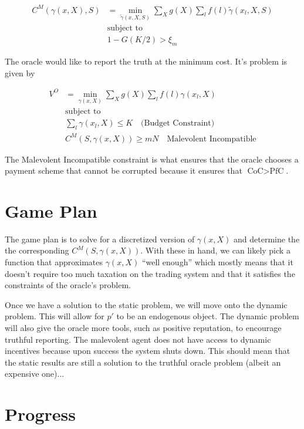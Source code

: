 \documentclass[12pt]{article}
\begin{document}
  \begin{align*}
    C^M(\gamma(x, X), S) &= \min_{\tilde{\gamma}(x, X, S)} \sum_{X} g(X) \sum_{l} f(l) \tilde{\gamma}(x_l, X, S) \\
    &\text{subject to} \\
    &1 - G(K/2) > \xi_m
  \end{align*}

  The oracle would like to report the truth at the minimum cost. It's problem is given by

  \begin{align*}
    V^O &= \min_{\gamma(x, X)} \sum_X g(X) \sum_l f(l) \gamma(x_l, X) \\
    &\text{subject to } \\
    &\sum_l \gamma(x_l, X) \leq K \quad \text{(Budget Constraint)} \\
    &C^M(S, \gamma(x, X)) \geq mN \quad \text{Malevolent Incompatible}
  \end{align*}

  The Malevolent Incompatible constraint is what ensures that the oracle chooses a payment scheme
  that cannot be corrupted because it ensures that $\text{CoC} > \text{PfC}$.


\section{Game Plan}

  The game plan is to solve for a discretized version of $\gamma(x, X)$ and determine the the
  corresponding $C^M(S, \gamma(x, X))$. With these in hand, we can likely pick a function that
  approximates $\gamma(x, X)$ ``well enough'' which mostly means that it doesn't require too
  much taxation on the trading system and that it satisfies the constraints of the oracle's problem.

  Once we have a solution to the static problem, we will move onto the dynamic problem. This will
  allow for $p'$ to be an endogenous object. The dynamic problem will also give the oracle more
  tools, such as positive reputation, to encourage truthful reporting. The malevolent agent does not
  have access to dynamic incentives because upon success the system shuts down. This should mean
  that the static results are still a solution to the truthful oracle problem (albeit an expensive
  one)...


\section{Progress}
\end{document}
